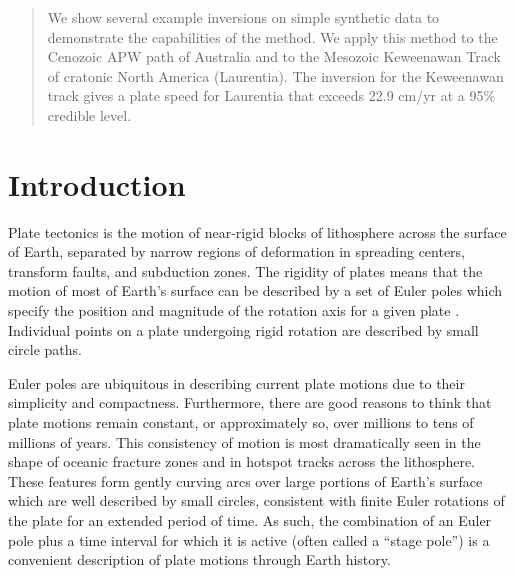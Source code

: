 \documentclass[preprint,12pt,authoryear]{elsarticle}
\begin{document}
\begin{frontmatter}
\begin{abstract}
We show several example inversions on simple synthetic data to demonstrate the capabilities of the method.
We apply this method to the Cenozoic APW path of Australia and to the
Mesozoic Keweenawan Track of cratonic North America (Laurentia).
The inversion for the Keweenawan track gives a plate speed for Laurentia
that exceeds 22.9 cm/yr at a 95\% credible level.
\end{abstract}

\begin{keyword}



\end{keyword}

\end{frontmatter}

\linenumbers

\section{Introduction}
\label{sec:introduction}

Plate tectonics is the motion of near-rigid blocks of lithosphere across the surface of Earth, 
separated by narrow regions of deformation in spreading centers, transform faults, and subduction zones.
The rigidity of plates means that the motion of most of Earth's surface
can be described by a set of Euler poles which specify the position and magnitude of the rotation axis for a
given plate \citep[cf.][]{cox2009plate}. Individual points on a plate undergoing
rigid rotation are described by small circle paths.

Euler poles are ubiquitous in describing current plate motions 
\citep[e.g.][]{demets1990current, argus2011geologically} due to their simplicity and compactness.
Furthermore, there are good reasons to think that plate motions remain constant, or approximately
so, over millions to tens of millions of years. This consistency of motion is most dramatically seen in the shape
of oceanic fracture zones and in hotspot tracks across the lithosphere. These features
form gently curving arcs over large portions of Earth's surface which are well described by small
circles, consistent with finite Euler rotations of the plate for an extended period of time.
As such, the combination of an Euler pole plus a time interval for which it is active 
(often called a ``stage pole'') is a convenient description of plate motions through Earth history.
\end{document}
